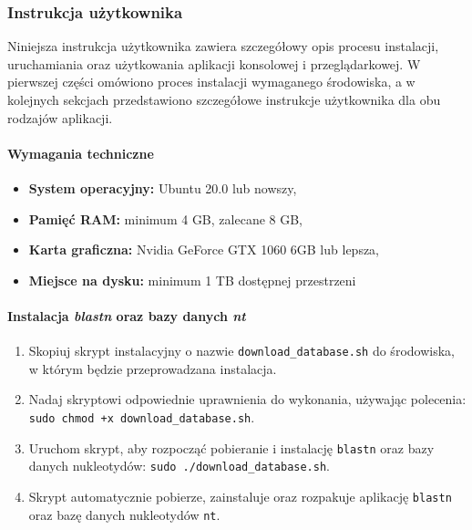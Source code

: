         \subsubsection{Instrukcja użytkownika}

            Niniejsza instrukcja użytkownika zawiera szczegółowy opis procesu instalacji, uruchamiania oraz użytkowania aplikacji konsolowej i przeglądarkowej. W pierwszej części omówiono proces instalacji wymaganego środowiska, a w kolejnych sekcjach przedstawiono szczegółowe instrukcje użytkownika dla obu rodzajów aplikacji.

            \paragraph{Wymagania techniczne}
                \begin{itemize}
                    \item {
                        \textbf{System operacyjny:} Ubuntu 20.0 lub nowszy,
                    }
                    \item {
                        \textbf{Pamięć RAM:} minimum 4 GB, zalecane 8 GB,
                    }
                    \item {
                        \textbf{Karta graficzna:} Nvidia GeForce GTX 1060 6GB lub lepsza,
                    }
                    \item {
                        \textbf{Miejsce na dysku:} minimum 1 TB dostępnej przestrzeni
                    }
                \end{itemize}

            \paragraph{Instalacja \textit{blastn} oraz bazy danych \textit{nt}}

                \begin{enumerate}
                    \item {
                        Skopiuj skrypt instalacyjny o nazwie \texttt{download\_database.sh} do środowiska, w którym będzie przeprowadzana instalacja.
                    }
                    \item {
                        Nadaj skryptowi odpowiednie uprawnienia do wykonania, używając polecenia: \texttt{sudo chmod +x download\_database.sh}.
                    }
                    \item {
                        Uruchom skrypt, aby rozpocząć pobieranie i instalację \texttt{blastn} oraz bazy danych nukleotydów: \texttt{sudo ./download\_database.sh}.
                    }
                    \item {
                        Skrypt automatycznie pobierze, zainstaluje oraz rozpakuje aplikację \texttt{blastn} oraz bazę danych nukleotydów \texttt{nt}.
                    }
                \end{enumerate}

